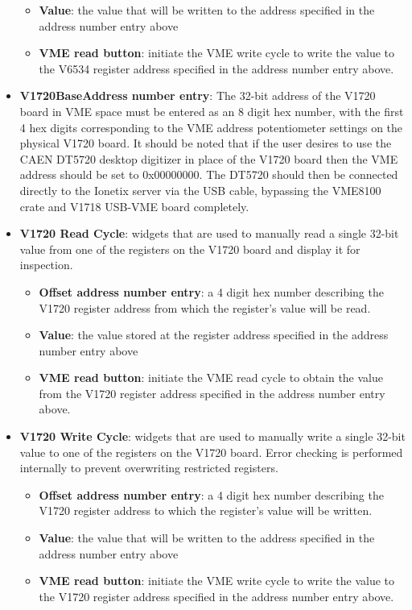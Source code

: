 \begin{itemize}
{\begin{itemize}
{          describing the V6534 register address to which the
          register's value will be written.}
      \item{\textbf{Value}: the value that will be written to the address
          specified in the address number entry above}
      \item{\textbf{VME read button}: initiate the VME write cycle to
          write the value to the V6534 register address specified in
          the address number entry above.}
      \end{itemize}
    }
  \item{\textbf{V1720BaseAddress number entry}: The 32-bit address of
    the V1720 board in VME space must be entered as an 8 digit hex
    number, with the first 4 hex digits corresponding to the VME
    address potentiometer settings on the physical V1720 board. It
    should be noted that if the user desires to use the CAEN DT5720
    desktop digitizer in place of the V1720 board then the VME address
    should be set to 0x00000000. The DT5720 should then be connected
    directly to the Ionetix server via the USB cable, bypassing the
    VME8100 crate and V1718 USB-VME board completely.}
  \item{\textbf{V1720 Read Cycle}: widgets that are used to manually
      read a single 32-bit value from one of the registers on the
      V1720 board and display it for inspection.
      \begin{itemize}
      \item{\textbf{Offset address number entry}: a 4 digit hex number
          describing the V1720 register address from which the
          register's value will be read.}
      \item{\textbf{Value}: the value stored at the register address
          specified in the address number entry above}
      \item{\textbf{VME read button}: initiate the VME read cycle to
          obtain the value from the V1720 register address specified
          in the address number entry above.}
      \end{itemize}
    }
  \item{\textbf{V1720 Write Cycle}: widgets that are used to manually
      write a single 32-bit value to one of the registers on the V1720
      board. Error checking is performed internally to prevent
      overwriting restricted registers.
      \begin{itemize}
      \item{\textbf{Offset address number entry}: a 4 digit hex number
          describing the V1720 register address to which the
          register's value will be written.}
      \item{\textbf{Value}: the value that will be written to the address
          specified in the address number entry above}
      \item{\textbf{VME read button}: initiate the VME write cycle to
          write the value to the V1720 register address specified in
          the address number entry above.}
      \end{itemize}
    }
\end{itemize}

